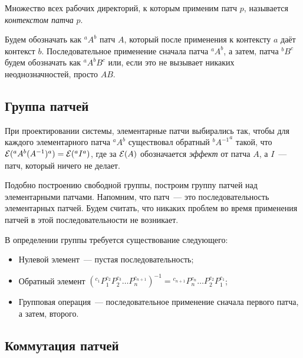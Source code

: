 \begin{definition}[Контекст]
  Множество всех рабочих директорий, к которым применим патч $p$,
  называется \emph{контекстом патча} $p$.
\end{definition}

\begin{notation}
  Будем обозначать как ${}^aA^b$ патч $A$, который после применения к
  контексту $a$ даёт контекст $b$. Последовательное применение сначала
  патча ${}^aA^b$, а затем, патча ${}^bB^c$ будем обозначать как
  ${}^aA^bB^c$ или, если это не вызывает никаких неоднозначностей,
  просто $AB$. 
\end{notation}

\subsection{Группа патчей}

При проектировании системы, элементарные патчи выбирались так, чтобы
для каждого элементарного патча ${}^aA^b$ существовал обратный
${}^b{A^{-1}}^a$ такой, что ${\cal E}({}^aA^b(A^{-1})^a) = {\cal
  E}({}^aI^a)$, где за ${\cal E}(A)$ обозначается \emph{эффект} от
патча $A$, а $I$~--- патч, который ничего не делает.

Подобно построению свободной группы, построим группу патчей над
элементарными патчами. Напомним, что патч~--- это последовательность
элементарных патчей. Будем считать, что никаких проблем во время
применения патчей в этой последовательности не возникает.

\begin{definition}
  В определении группы требуется существование следующего:

  \begin{itemize}
  \item Нулевой элемент~--- пустая последовательность;
  \item Обратный элемент
    $({}^{c_1}P_1^{c_2}P_2^{c_3}\ldots P_n^{c_{n+1}})^{-1} =
    {}^{c_{n+1}}P_n^{c_n}\ldots P_2^{c_2}P_1^{c_1}$;
  \item Групповая операция~--- последовательное применение сначала
    первого патча, а затем, второго.
  \end{itemize}
\end{definition}

\subsection{Коммутация патчей}

